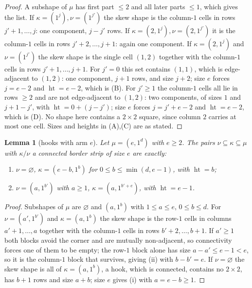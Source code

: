 \documentclass[11pt]{article}
\theoremstyle{plain}
\newtheorem{lemma}[theorem]{Lemma}
\theoremstyle{definition}
\DeclareMathOperator{\hgt}{ht}
\begin{document}
\begin{proof}
A subshape of $\mu$ has first part $\le2$ and all later parts $\le1$, which gives
the list.  If $\kappa=(1^j),\nu=(1^{j'})$ the skew shape is the column-$1$ cells
in rows $j'+1,\dots,j$: one component, $j-j'$ rows.  If
$\kappa=(2,1^j),\nu=(2,1^{j'})$ it is the column-$1$ cells in rows
$j'+2,\dots,j+1$: again one component.  If $\kappa=(2,1^j)$ and $\nu=(1^{j'})$
the skew shape is the single cell $(1,2)$ together with the column-$1$ cells in
rows $j'+1,\dots,j+1$.  For $j'=0$ this set contains $(1,1)$, which is
edge-adjacent to $(1,2)$: one component, $j+1$ rows, and size $j+2$; size $e$
forces $j=e-2$ and $\hgt=e-2$, which is (B).  For $j'\ge1$ the column-$1$ cells
all lie in rows $\ge2$ and are not edge-adjacent to $(1,2)$: two components, of
sizes $1$ and $j+1-j'$, with $\hgt=0+(j-j')$; size $e$ forces $j=j'+e-2$ and
$\hgt=e-2$, which is (D).  No shape here contains a $2\times2$ square, since
column $2$ carries at most one cell.  Sizes and heights in (A),(C) are as
stated.
\end{proof}

\begin{lemma}[hooks with arm $e$]\label{lem:hooke}
Let $\mu=(e,1^d)$ with $e\ge2$.  The pairs $\nu\subseteq\kappa\subseteq\mu$ with
$\kappa/\nu$ a connected border strip of size $e$ are exactly:
\begin{enumerate}
\item[(i)] $\nu=\varnothing$, $\kappa=(e-b,1^{b})$ for $0\le b\le\min(d,e-1)$,
with $\hgt=b$;
\item[(ii)] $\nu=(a,1^{b'})$ with $a\ge1$, $\kappa=(a,1^{b'+e})$, with
$\hgt=e-1$.
\end{enumerate}
\end{lemma}

\begin{proof}
Subshapes of $\mu$ are $\varnothing$ and $(a,1^b)$ with $1\le a\le e$,
$0\le b\le d$.  For $\nu=(a',1^{b'})$ and $\kappa=(a,1^b)$ the skew shape is the
row-$1$ cells in columns $a'+1,\dots,a$ together with the column-$1$ cells in
rows $b'+2,\dots,b+1$.  If $a'\ge1$ both blocks avoid the corner and are
mutually non-adjacent, so connectivity forces one of them to be empty; the
row-$1$ block alone has size $a-a'\le e-1<e$, so it is the column-$1$ block that
survives, giving (ii) with $b-b'=e$.  If $\nu=\varnothing$ the skew shape is all
of $\kappa=(a,1^b)$, a hook, which is connected, contains no $2\times2$, has
$b+1$ rows and size $a+b$; size $e$ gives (i) with $a=e-b\ge1$.
\end{proof}
\end{document}
